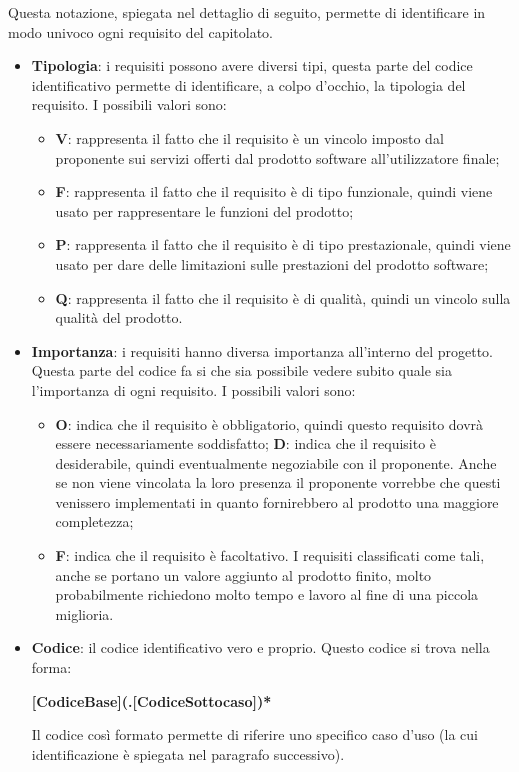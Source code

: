 \documentclass[../norme-di-progetto.tex]{subfiles}
\begin{document}
Questa notazione, spiegata nel dettaglio di seguito, permette di identificare in modo univoco ogni requisito del capitolato.
\begin{itemize}
    \item \textbf{Tipologia}: i requisiti possono avere diversi tipi, questa parte del codice identificativo permette di identificare, a colpo d'occhio, la tipologia del requisito. I possibili valori sono:
    \begin{itemize}
        \item \textbf{V}: rappresenta il fatto che il requisito è un vincolo imposto dal proponente sui servizi offerti dal prodotto software all'utilizzatore finale;
        \item \textbf{F}: rappresenta il fatto che il requisito è di tipo funzionale, quindi viene usato per rappresentare le funzioni del prodotto;
        \item \textbf{P}: rappresenta il fatto che il requisito è di tipo prestazionale, quindi viene usato per dare delle limitazioni sulle prestazioni del prodotto software;
        \item \textbf{Q}: rappresenta il fatto che il requisito è di qualità, quindi un vincolo sulla qualità del prodotto.
    \end{itemize}
    
    \item \textbf{Importanza}: i requisiti hanno diversa importanza all'interno del progetto. Questa parte del codice fa si che sia possibile vedere subito quale sia l'importanza di ogni requisito. I possibili valori sono:
    \begin{itemize}
        \item \textbf{O}: indica che il requisito è obbligatorio, quindi questo requisito dovrà essere necessariamente soddisfatto;
        \itme \textbf{D}: indica che il requisito è desiderabile, quindi eventualmente negoziabile con il proponente. Anche se non viene vincolata la loro presenza il proponente vorrebbe che questi venissero implementati in quanto fornirebbero al prodotto una maggiore completezza;
        \item \textbf{F}: indica che il requisito è facoltativo. I requisiti classificati come tali, anche se portano un valore aggiunto al prodotto finito, molto probabilmente richiedono molto tempo e lavoro al fine di una piccola miglioria.
    \end{itemize}
    
    \item \textbf{Codice}: il codice identificativo vero e proprio. Questo codice si trova nella forma:
    \begin{center}
        \textbf{[CodiceBase](.[CodiceSottocaso])*}
    \end{center}
    Il codice così formato permette di riferire uno specifico caso d'uso (la cui identificazione è spiegata nel paragrafo successivo).
\end{itemize}
\end{document}
